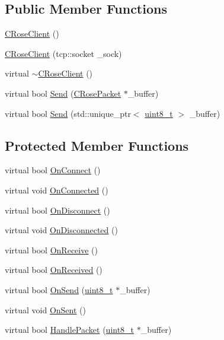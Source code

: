 \subsection*{Public Member Functions}
\begin{DoxyCompactItemize}
\item 
\hyperlink{classCRoseClient_a47aa42bcece31483fdda36405ac818c3}{C\+Rose\+Client} ()
\item 
\hyperlink{classCRoseClient_a3722cbf0d1a8371d9c47768d7dcb1ab3}{C\+Rose\+Client} (tcp\+::socket \+\_\+sock)
\item 
virtual \hyperlink{classCRoseClient_ae10fe7626084ca7b32ebe7902e7a9200}{$\sim$\+C\+Rose\+Client} ()
\item 
virtual bool \hyperlink{classCRoseClient_ad93412a8bf19478312ee3915da2269f0}{Send} (\hyperlink{structCRosePacket}{C\+Rose\+Packet} $\ast$\+\_\+buffer)
\item 
virtual bool \hyperlink{classCRoseClient_ac57917ce363ae033405d86245177d98a}{Send} (std\+::unique\+\_\+ptr$<$ \hyperlink{stdint_8h_aba7bc1797add20fe3efdf37ced1182c5}{uint8\+\_\+t} $>$ \+\_\+buffer)
\end{DoxyCompactItemize}
\subsection*{Protected Member Functions}
\begin{DoxyCompactItemize}
\item 
virtual bool \hyperlink{classCRoseClient_a5450e4e524b6c2463bfecb07f5d648a6}{On\+Connect} ()
\item 
virtual void \hyperlink{classCRoseClient_a4530061e80795225e9236dcfcad8e82c}{On\+Connected} ()
\item 
virtual bool \hyperlink{classCRoseClient_a2acc0696fe18b4632e8e9fe621cc9a90}{On\+Disconnect} ()
\item 
virtual void \hyperlink{classCRoseClient_a804ac017f0af609e71d9998f92084579}{On\+Disconnected} ()
\item 
virtual bool \hyperlink{classCRoseClient_a6e14ddb8d521b05b4b3d7882b2b239de}{On\+Receive} ()
\item 
virtual bool \hyperlink{classCRoseClient_ac2e1b4badf1f40ca96fb43f3d4c233fc}{On\+Received} ()
\item 
virtual bool \hyperlink{classCRoseClient_a320e55d923e9e8bc57b2701f1f68c2bd}{On\+Send} (\hyperlink{stdint_8h_aba7bc1797add20fe3efdf37ced1182c5}{uint8\+\_\+t} $\ast$\+\_\+buffer)
\item 
virtual void \hyperlink{classCRoseClient_ac9200621c8aee5cadebe4d158cfac5ed}{On\+Sent} ()
\item 
virtual bool \hyperlink{classCRoseClient_ac138e3beed05b7a647508f4704b75aa5}{Handle\+Packet} (\hyperlink{stdint_8h_aba7bc1797add20fe3efdf37ced1182c5}{uint8\+\_\+t} $\ast$\+\_\+buffer)
\end{DoxyCompactItemize}
